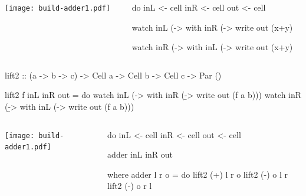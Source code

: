\documentclass[UKenglish,usenames,dvipsnames,svgnames,table,aspectratio=169,mathserif]{beamer}
\newcommand{\nl}{\vspace{\baselineskip}}
\newcommand{\pnl}{\pause \nl}
\begin{document}
\begin{frame}[fragile]
\centering

\begin{columns}
\begin{column}{0.5\textwidth}
\begin{overlayarea}{0.5\textwidth}{0.4\textheight}
\texttt{[image: build-adder1.pdf]}
\end{overlayarea}
\end{column}
\begin{column}{0.5\textwidth}
\begin{haskellcode}
do
  inL  <- cell
  inR  <- cell
  out  <- cell
\end{haskellcode}
\nl
\begin{haskellcode}
  watch inL (\x ->
    with inR (\y ->
      write out (x+y)
\end{haskellcode}
\pnl
\begin{haskellcode}
  watch inR (\y ->
    with inL (\x ->
      write out (x+y)
\end{haskellcode}
\end{column}
\end{columns}
\end{frame}


\begin{frame}[fragile]
\begin{haskellcode}
          lift2 :: (a -> b -> c)
                -> Cell a -> Cell b -> Cell c
                -> Par ()
\end{haskellcode}
\pause
\begin{haskellcode}
          lift2 f inL inR out = do
            watch inL (\a ->
              with inR (\b ->
                write out (f a b)))
            watch inR (\b ->
              with inL (\a ->
                write out (f a b)))
\end{haskellcode}

\end{frame}


\begin{frame}[fragile]
\centering

\begin{columns}
\begin{column}{0.5\textwidth}
\begin{overlayarea}{0.5\textwidth}{0.4\textheight}
\texttt{[image: build-adder1.pdf]}
\end{overlayarea}
\end{column}
\begin{column}{0.5\textwidth}
\begin{haskellcode}
do
  inL  <- cell
  inR  <- cell
  out  <- cell
\end{haskellcode}
\nl
\begin{haskellcode}
  adder inL inR out

    where
      adder l r o = do
        lift2 (+) l r o
        lift2 (-) o l r
        lift2 (-) o r l
\end{haskellcode}
\end{column}
\end{columns}
\end{frame}
\end{document}
